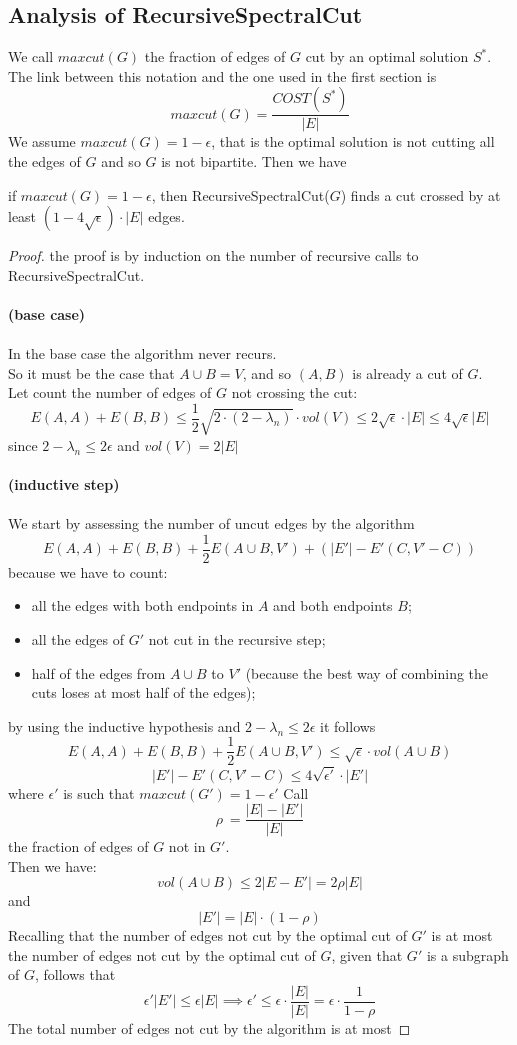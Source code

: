 \subsection{Analysis of RecursiveSpectralCut}
We call $ maxcut(G) $ the fraction of edges of $ G $ cut by an optimal solution $ S^* $. The link between this notation and the one used in the first section is
\[ maxcut(G) = \frac{COST(S^*)}{|E|}\]
We assume $ maxcut(G) = 1-\epsilon $, that is the optimal solution is not cutting all the edges of $ G $ and so $ G $ is not bipartite. Then we have
\begin{lemma} if $ maxcut(G) = 1-\epsilon$, then RecursiveSpectralCut($ G $) finds a cut crossed by at least $(1-4\sqrt{\epsilon})\cdot |E| $ edges.
\begin{proof}
the proof is by induction on the number of recursive calls to RecursiveSpectralCut.
\\
\\
\textbf{(base case)}
\\
\\
In the base case the algorithm never recurs. \\
So it must be the case that $ A \cup B = V $, and so $ (A,B) $ is already a cut of $ G $. \\
Let count the number of edges of $ G $ not crossing the cut:
\[
E(A,A) + E(B,B) \leq \frac{1}{2} \sqrt{2 \cdot (2-\lambda_n)} \cdot vol(V)
\leq 2\sqrt{\epsilon} \cdot |E| \leq 4 \sqrt{\epsilon} |E|
\]
since $ 2-\lambda_n \leq 2\epsilon $ and $ vol(V) = 2|E| $
\\
\\
\textbf{(inductive step)}
\\
\\
We start by assessing the number of uncut edges by the algorithm
\[ E(A,A) + E(B,B) + \frac{1}{2}E(A \cup B, V') + (|E'| - E'(C,V'-C)) \]
because we have to count:
\begin{itemize}
\item all the edges with both endpoints in $ A $ and both endpoints $ B $;
\item all the edges of $ G' $ not cut in the recursive step;
\item half of the edges from $ A \cup B  $ to $ V' $ (because the best way of combining the cuts loses at most half of the edges);
\end{itemize}
by using the inductive hypothesis and $ 2-\lambda_n \leq 2\epsilon $ it follows
\[  E(A,A) + E(B,B) + \frac{1}{2}E(A \cup B, V') \leq \sqrt{\epsilon} \cdot vol(A \cup B) \]
\[ |E'| - E'(C,V'-C) \leq 4\sqrt{\epsilon'} \cdot |E'| \]
where $ \epsilon' $ is such that $ maxcut(G') = 1-\epsilon' $
Call
\[ \rho\ = \frac{|E|-|E'|}{|E|}\]
the fraction of edges of $ G $ not in $ G' $.\\
Then we have:
\[vol(A \cup B) \leq 2|E-E'| = 2\rho |E| \]
and
\[ |E'| = |E| \cdot (1-\rho) \]
Recalling that the number of edges not cut by the optimal cut of $ G' $ is at most the number of edges not cut by the optimal cut of $ G $, given that $ G' $ is a subgraph of $ G $, follows that
\[ \epsilon'|E'| \leq \epsilon|E| \implies \epsilon' \leq \epsilon \cdot \frac{|E|}{|E|} = \epsilon \cdot \frac{1}{1- \rho} \]
The total number of edges not cut by the algorithm is at most


\end{proof}
\end{lemma}
